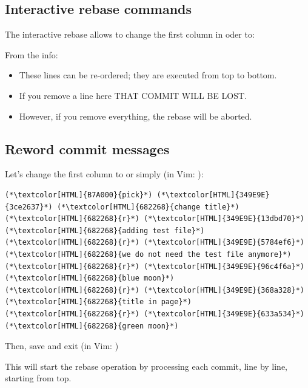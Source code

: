 \subsection{Interactive rebase commands}
\begin{frame}[fragile]
  \subslidetitle

  The interactive rebase allows to change the first column in oder to:

  \begin{itemize}
  \end{itemize}

  \vspace{1em}
  From the  info:
  \begin{itemize}
    \item These lines can be re-ordered; they are executed from top to bottom.
    \item If you remove a line here THAT COMMIT WILL BE LOST.
    \item However, if you remove everything, the rebase will be aborted.
  \end{itemize}

\end{frame}

\subsection{Reword commit messages}
\begin{frame}[fragile]
  \subslidetitle

  Let's change the first column to  or simply  (in Vim: ):
  \begin{lstlisting}
(*\textcolor[HTML]{B7A000}{pick}*) (*\textcolor[HTML]{349E9E}{3ce2637}*) (*\textcolor[HTML]{682268}{change title}*)
(*\textcolor[HTML]{682268}{r}*) (*\textcolor[HTML]{349E9E}{13dbd70}*) (*\textcolor[HTML]{682268}{adding test file}*)
(*\textcolor[HTML]{682268}{r}*) (*\textcolor[HTML]{349E9E}{5784ef6}*) (*\textcolor[HTML]{682268}{we do not need the test file anymore}*)
(*\textcolor[HTML]{682268}{r}*) (*\textcolor[HTML]{349E9E}{96c4f6a}*) (*\textcolor[HTML]{682268}{blue moon}*)
(*\textcolor[HTML]{682268}{r}*) (*\textcolor[HTML]{349E9E}{368a328}*) (*\textcolor[HTML]{682268}{title in page}*)
(*\textcolor[HTML]{682268}{r}*) (*\textcolor[HTML]{349E9E}{633a534}*) (*\textcolor[HTML]{682268}{green moon}*)
\end{lstlisting}
  Then, save and exit (in Vim: )

  \vspace{1em}
  This will start the rebase operation by processing each commit, line by line, starting from top.

\end{frame}

